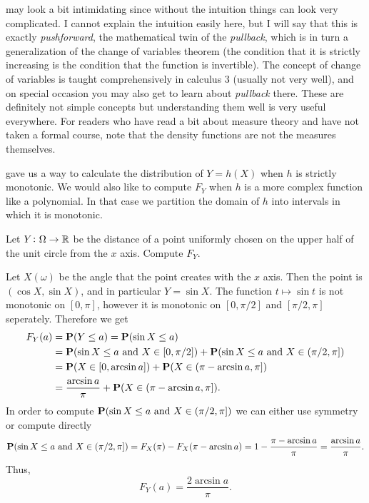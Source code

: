 \documentclass[11pt,a4paper]{article}
\begin{document}
\begin{remark}
   may look a bit intimidating since
  without the intuition things can look very complicated.
  I cannot explain the intuition easily here,
  but I will say that this is exactly \textit{pushforward},
  the mathematical twin of the \textit{pullback},
  which is in turn a generalization of the change of variables
  theorem (the condition that it is strictly increasing
  is the condition that the function is invertible).
  The concept of change of variables is taught comprehensively
  in calculus $3$ (usually not very well),
  and on special occasion you may also get to learn about
  \textit{pullback} there.
  These are definitely not simple concepts but understanding them
  well is very useful everywhere.
  For readers who have read a bit about measure theory
  and have not taken a formal course, note that the density
  functions are not the measures themselves.
\end{remark}

\begin{remark}
  gave us a way to calculate the distribution of
  $Y = h(X)$ when $h$ is strictly monotonic.
  We would also like to compute $F_Y$ when $h$ is a more complex
  function like a polynomial.
  In that case we partition the domain of $h$ into intervals
  in which it is monotonic.
\end{remark}
\begin{exercise}
  Let $Y \colon \Omega \to \mathbb{R}$ be the distance of a point uniformly chosen
  on the upper half of the unit circle from the $x$ axis.
  Compute $F_Y$.
\end{exercise}
\begin{solution}
  Let $X(\omega)$ be the angle that the point creates with the $x$ axis.
  Then the point is $(\cos X, \sin X)$, and in particular $Y = \sin X$.
  The function $t \mapsto \sin t$ is not monotonic on $[0,\pi]$,
  however it is monotonic on $[0,\pi/2]$ and $[\pi/2,\pi]$ seperately.
  Therefore we get
  \begin{align*}
    F_Y(a) &= 
    \mathbf{P}(Y \le a) = \mathbf{P}(\sin X \le a) \\ &=
    \mathbf{P}(\sin X \le a \text{ and } X \in [0,\pi/2]) +
    \mathbf{P}(\sin X \le a \text{ and } X \in (\pi/2,\pi]) \\ &=
    \mathbf{P}(X \in [0,\arcsin a]) +
    \mathbf{P}(X \in (\pi - \arcsin a,\pi]) \\ &=
    \frac{\arcsin a}{\pi} + \mathbf{P}(X \in (\pi - \arcsin a,\pi]).
  \end{align*}
  In order to compute $\mathbf{P}(\sin X \le a \text{ and } X \in (\pi/2,\pi])$
  we can either use symmetry or compute directly
  \[
    \mathbf{P}(\sin X \le a \text{ and } X \in (\pi/2,\pi]) =
    F_X(\pi) - F_X(\pi - \arcsin a) =
    1 - \frac{\pi - \arcsin a}{\pi} = \frac{\arcsin a}{\pi}.
  \]
  Thus,
  \[
    F_Y(a) =
    \frac{2\arcsin a}{\pi}.
  \]
\end{solution}
\end{document}
